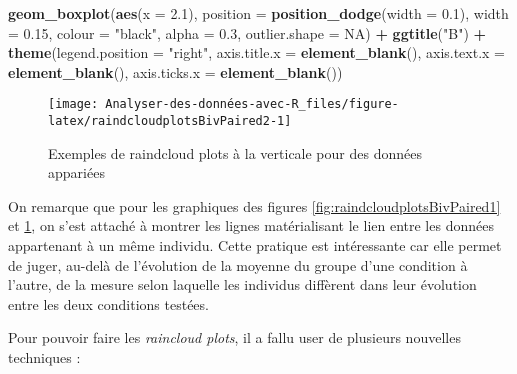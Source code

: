 \documentclass[
  french,
]{book}
\newenvironment{Shaded}{\begin{snugshade}}{\end{snugshade}}
\newcommand{\DataTypeTok}[1]{\textcolor[rgb]{0.13,0.29,0.53}{#1}}
\newcommand{\FloatTok}[1]{\textcolor[rgb]{0.00,0.00,0.81}{#1}}
\newcommand{\KeywordTok}[1]{\textcolor[rgb]{0.13,0.29,0.53}{\textbf{#1}}}
\newcommand{\NormalTok}[1]{#1}
\newcommand{\OperatorTok}[1]{\textcolor[rgb]{0.81,0.36,0.00}{\textbf{#1}}}
\newcommand{\OtherTok}[1]{\textcolor[rgb]{0.56,0.35,0.01}{#1}}
\newcommand{\StringTok}[1]{\textcolor[rgb]{0.31,0.60,0.02}{#1}}
\begin{document}
\begin{Shaded}
\begin{Highlighting}[]
\StringTok{  }\KeywordTok{geom_boxplot}\NormalTok{(}\KeywordTok{aes}\NormalTok{(}\DataTypeTok{x =} \FloatTok{2.1}\NormalTok{),}
               \DataTypeTok{position =} \KeywordTok{position_dodge}\NormalTok{(}\DataTypeTok{width =} \FloatTok{0.1}\NormalTok{),}
               \DataTypeTok{width =} \FloatTok{0.15}\NormalTok{, }\DataTypeTok{colour =} \StringTok{"black"}\NormalTok{, }\DataTypeTok{alpha =} \FloatTok{0.3}\NormalTok{, }
               \DataTypeTok{outlier.shape =} \OtherTok{NA}\NormalTok{) }\OperatorTok{+}
\StringTok{  }\KeywordTok{ggtitle}\NormalTok{(}\StringTok{"B"}\NormalTok{) }\OperatorTok{+}
\StringTok{  }\KeywordTok{theme}\NormalTok{(}\DataTypeTok{legend.position =} \StringTok{"right"}\NormalTok{,}
        \DataTypeTok{axis.title.x =} \KeywordTok{element_blank}\NormalTok{(),}
        \DataTypeTok{axis.text.x =} \KeywordTok{element_blank}\NormalTok{(),}
        \DataTypeTok{axis.ticks.x =} \KeywordTok{element_blank}\NormalTok{())}
\end{Highlighting}
\end{Shaded}

\begin{figure}

{\centering \texttt{[image: Analyser-des-données-avec-R\_files/figure-latex/raindcloudplotsBivPaired2-1]} 

}

\caption{Exemples de raindcloud plots à la verticale pour des données appariées}\label{fig:raindcloudplotsBivPaired2}
\end{figure}

On remarque que pour les graphiques des figures \ref{fig:raindcloudplotsBivPaired1} et \ref{fig:raindcloudplotsBivPaired2}, on s'est attaché à montrer les lignes matérialisant le lien entre les données appartenant à un même individu. Cette pratique est intéressante car elle permet de juger, au-delà de l'évolution de la moyenne du groupe d'une condition à l'autre, de la mesure selon laquelle les individus diffèrent dans leur évolution entre les deux conditions testées.

Pour pouvoir faire les \emph{raincloud plots}, il a fallu user de plusieurs nouvelles techniques :
\end{document}
